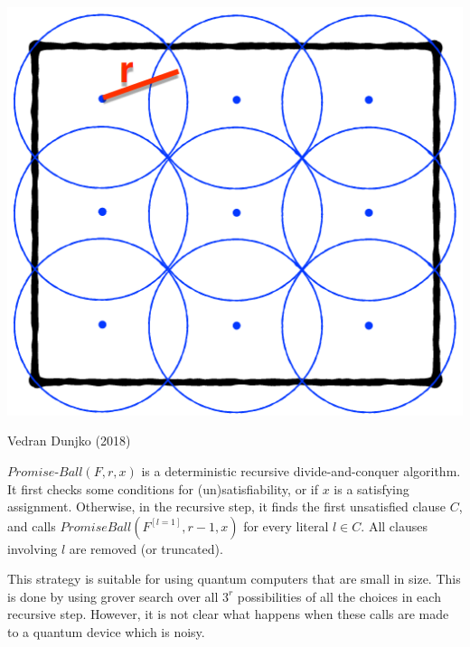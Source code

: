 \documentclass[portrait,a0paper,fontscale=0.285]{baposter} %
\begin{document}
\begin{poster}
{\begin{center}
	\includegraphics[scale=0.168]{PromiseBall.png}

	\begin{tiny}Vedran Dunjko (2018)\end{tiny}
\end{center}
$Promise$-$Ball(F,r,x)$ is a deterministic recursive divide-and-conquer algorithm. It first checks some conditions for (un)satisfiability, or if $x$ is a satisfying assignment. Otherwise, in the recursive step, it finds the first unsatisfied clause $C$, and calls $PromiseBall(F^{[l=1]},r−1,x)$ for every literal $l\in C$. All clauses involving $l$ are removed (or truncated).

This strategy is suitable for using quantum computers that are small in size. This is done by using grover search over all $3^{r}$ possibilities of all the choices in each recursive step. However, it is not clear what happens when these calls are made to a quantum device which is noisy.

	
}


\end{poster}
\end{document}
